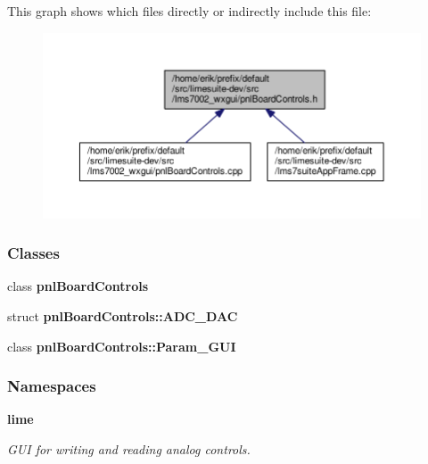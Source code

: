 This graph shows which files directly or indirectly include this file\+:
\nopagebreak
\begin{figure}[H]
\begin{center}
\leavevmode
\includegraphics[width=350pt]{da/d04/pnlBoardControls_8h__dep__incl}
\end{center}
\end{figure}
\subsubsection*{Classes}
\begin{DoxyCompactItemize}
\item 
class {\bf pnl\+Board\+Controls}
\item 
struct {\bf pnl\+Board\+Controls\+::\+A\+D\+C\+\_\+\+D\+AC}
\item 
class {\bf pnl\+Board\+Controls\+::\+Param\+\_\+\+G\+UI}
\end{DoxyCompactItemize}
\subsubsection*{Namespaces}
\begin{DoxyCompactItemize}
\item 
 {\bf lime}
\begin{DoxyCompactList}\small\item\em G\+UI for writing and reading analog controls. \end{DoxyCompactList}\end{DoxyCompactItemize}
